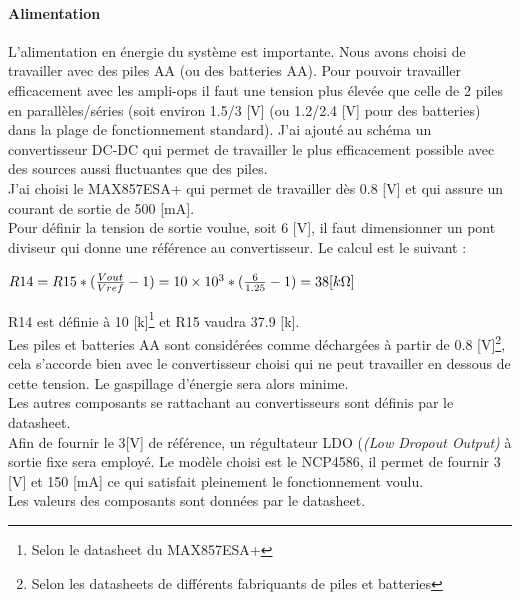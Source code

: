 \documentclass[a4paper,10pt]{article}
\begin{document}
 \paragraph{Alimentation}
 L'alimentation en énergie du système est importante. Nous avons choisi de travailler avec des piles AA (ou des batteries AA). Pour pouvoir travailler efficacement avec les ampli-ops il faut une tension plus élevée que celle de 2 piles en parallèles/séries (soit environ 1.5/3 [V] (ou 1.2/2.4 [V] pour des batteries) dans la plage de fonctionnement standard). J'ai ajouté au schéma un convertisseur DC-DC qui permet de travailler le plus efficacement possible avec des sources aussi fluctuantes que des piles. \\
 J'ai choisi le MAX857ESA+ qui permet de travailler dès 0.8 [V] et qui assure un courant de sortie de 500 [mA]. \\
 Pour définir la tension de sortie voulue, soit 6 [V], il faut dimensionner un pont diviseur qui donne une référence au convertisseur. Le calcul est le suivant :
\begin{center}
 $ R14 = R15*(\frac{Vout}{Vref}-1) = \num{10e3}*(\frac{6}{1.25}-1) = 38 [k\ohm]$
\end{center} 
R14 est définie à 10 [k\ohm]\footnote{Selon le datasheet du MAX857ESA+} et R15 vaudra 37.9 [k\ohm].\\
Les piles et batteries AA sont considérées comme déchargées à partir de 0.8 [V]\footnote{Selon les datasheets de différents fabriquants de piles et batteries}, cela s'accorde bien avec le convertisseur choisi qui ne peut travailler en dessous de cette tension. Le gaspillage d'énergie sera alors minime.\\
Les autres composants se rattachant au convertisseurs sont définis par le datasheet.\\
Afin de fournir le 3[V] de référence, un régultateur LDO ({\itshape(Low Dropout Output)} à sortie fixe sera employé. Le modèle choisi est le NCP4586, il permet de fournir 3 [V] et 150 [mA] ce qui satisfait pleinement le fonctionnement voulu.\\
Les valeurs des composants sont données par le datasheet.
\end{document}
